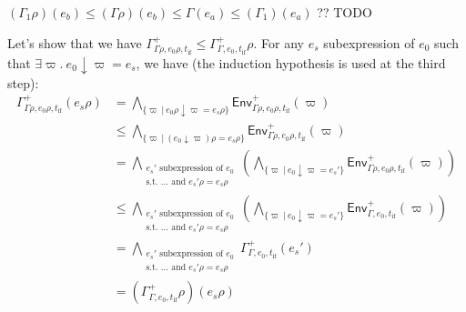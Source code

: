 \documentclass[a4paper]{article}%
\newcommand{\alt}{~|~}
\newcommand{\tyof}[2]{\textsf{typeof}_{#2}(#1)}
\newcommand{\Gp}[2]{\textsf{Env}^{#1}_{#2}}
\theoremstyle{definition}
\begin{document}
\begin{description}
\begin{itemize}
            $(\Gamma_1\rho)(e_b) \leq (\Gamma\rho)(e_b) \leq \Gamma(e_a) \leq (\Gamma_1)(e_a)$ ?? TODO
            
    
    
            Let's show that we have $\Gamma^+_{\Gamma\rho,e_0\rho,t_{\text{if}}} \leq \Gamma^+_{\Gamma,e_0,t_{\text{if}}}\rho$.
            For any $e_s$ subexpression of $e_0$ such that $\exists \varpi.\ e_0\downarrow\varpi=e_s$, we have (the induction hypothesis is used at the third step):
            \begin{align*}
              \Gamma^+_{\Gamma\rho,e_0\rho,t_{\text{if}}}(e_s\rho) &= \bigwedge_{\{\varpi\alt e_0\rho\downarrow\varpi=e_s\rho\}} \Gp + {\Gamma\rho,e_0\rho,t_{\text{if}}} (\varpi)\\
              &\leq \bigwedge_{\{\varpi\alt (e_0\downarrow\varpi)\rho=e_s\rho\}} \Gp + {\Gamma\rho,e_0\rho,t_{\text{if}}} (\varpi)\\
              &= \bigwedge_{\substack{e_s' \text{ subexpression of } e_0\\\text{s.t. } \dots \text{ and } e_s'\rho=e_s\rho}} \left(\bigwedge_{\{\varpi\alt e_0\downarrow\varpi=e_s'\}} \Gp + {\Gamma\rho,e_0\rho,t_{\text{if}}} (\varpi)\right)\\
              &\leq \bigwedge_{\substack{e_s' \text{ subexpression of } e_0\\\text{s.t. } \dots \text{ and } e_s'\rho=e_s\rho}} \left(\bigwedge_{\{\varpi\alt e_0\downarrow\varpi=e_s'\}} \Gp + {\Gamma,e_0,t_{\text{if}}} (\varpi)\right)\\
              &= \bigwedge_{\substack{e_s' \text{ subexpression of } e_0\\\text{s.t. } \dots \text{ and } e_s'\rho=e_s\rho}} \Gamma^+_{\Gamma,e_0,t_{\text{if}}} (e_s')\\
              &= (\Gamma^+_{\Gamma,e_0,t_{\text{if}}}\rho)(e_s\rho)
            \end{align*}
    
    

\end{itemize}
\end{description}
\end{document}
